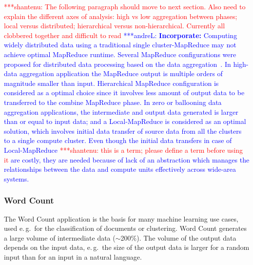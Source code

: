 \documentclass{acm_proc_article-sp}
\newcommand{\jhanote}[1]{ {\textcolor{red} { ***shantenu: #1 }}}
\newcommand{\alnote}[1]{ {\textcolor{blue} { ***andreL: #1 }}}
\newcommand{\pnote}[1]{ {\textcolor{magenta} { ***pradeep: #1 }}}
\newcommand{\alnote}[1]{}
\newcommand{\pnote}[1]{}
\newcommand{\jhanote}[1]{}
\begin{document}
\jhanote{The following paragraph should move to next section. Also
  need to explain the different axes of analysis: high vs low
  aggregation between phases; local versus distributed; hierarchical
  versus non-hierarchical. Currently all clobbered together and
  difficult to read} 
\alnote{\textbf{Incorporate:} Computing widely distributed data using a traditional single cluster-MapReduce
may not achieve optimal MapReduce runtime. Several MapReduce configurations were
proposed for distributed data processing based on the data
aggregation~\cite{weissman-mr-11}. In high-data aggregation application the
MapReduce output is multiple orders of magnitude smaller than input.
Hierarchical MapReduce configuration is considered as a optimal choice since it
involves less amount of output data to be transferred to the combine MapReduce
phase. In zero or ballooning data aggregation applications, the intermediate and
output data generated is larger than or equal to input data; and a
Local-MapReduce is considered as an optimal solution, which involves initial
data transfer of source data from all the clusters to a single compute cluster.
Even though the initial data transfers in case of Local-MapReduce \jhanote{this
is a term; please define a term before using it} are costly, they are needed
because of lack of an abstraction which manages the relationships between the
data and compute units effectively across wide-area systems.}



\subsubsection*{Word Count}

The Word Count application is the basis for many machine learning use cases, 
used e.\,g.\ for the classification of documents or clustering. Word Count 
generates a large volume of intermediate data ($\sim$200$\%$). The volume of the 
output data depends on the input data, e.\,g.\ the size of the output data is 
larger for a random input than for an input in a natural language. 
\end{document}
